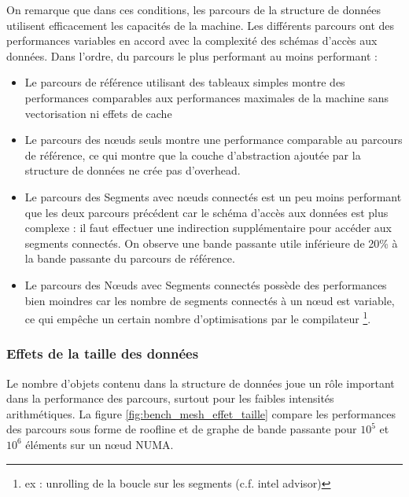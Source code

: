 On remarque que dans ces conditions, les parcours de la structure de données utilisent efficacement les capacités de la machine. Les différents parcours ont des performances variables en accord avec la complexité des schémas d'accès aux données. Dans l'ordre, du parcours le plus performant au moins performant :
\begin{itemize}
    \item Le parcours de référence utilisant des tableaux simples montre des performances comparables aux performances maximales de la machine sans vectorisation ni effets de cache
    \item Le parcours des nœuds seuls montre une performance comparable au parcours de référence, ce qui montre que la couche d'abstraction ajoutée par la structure de données ne crée pas d'overhead.
    \item Le parcours des Segments avec nœuds connectés est un peu moins performant que les deux parcours précédent car le schéma d'accès aux données est plus complexe : il faut effectuer une indirection supplémentaire pour accéder aux segments connectés. On observe une bande passante utile inférieure de 20\% à la bande passante du parcours de référence.
    \item Le parcours des Nœuds avec Segments connectés possède des performances bien moindres car les nombre de segments connectés à un nœud est variable, ce qui empêche un certain nombre d'optimisations par le compilateur \footnote{ex : unrolling de la boucle sur les segments (c.f. intel advisor)}.
\end{itemize}

\subsubsection{Effets de la taille des données}

Le nombre d'objets contenu dans la structure de données joue un rôle important dans la performance des parcours, surtout pour les faibles intensités arithmétiques. La figure \ref{fig:bench_mesh_effet_taille} compare les performances des parcours sous forme de roofline et de graphe de bande passante pour $10^5$ et $10^6$ éléments sur un nœud NUMA.

